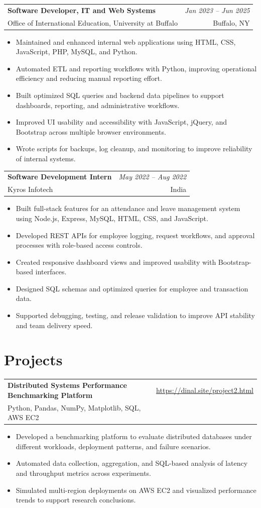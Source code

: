 \documentclass[letterpaper,10pt]{article}
\makeatletter
\newcommand{\resumeSubheading}[4]{
  \vspace{1pt}
  \begin{tabularx}{\textwidth}{@{}Xr@{}}
    \textbf{#1} & \textit{#2} \\
    \textcolor{textgray}{#3} & \textcolor{textgray}{#4} \\
  \end{tabularx}
}
\newcommand{\resumeProjectHeading}[3]{
  \vspace{1pt}
  \begin{tabularx}{\textwidth}{@{}Xr@{}}
    \textbf{#1} & \href{#3}{\textcolor{accent}{#3}} \\
    \textcolor{textgray}{#2} & \\
  \end{tabularx}
}
\makeatother
\begin{document}
\resumeSubheading
  {Software Developer, IT and Web Systems}{Jan 2023 -- Jun 2025}
  {Office of International Education, University at Buffalo}{Buffalo, NY}
\begin{itemize}
  \item Maintained and enhanced internal web applications using HTML, CSS, JavaScript, PHP, MySQL, and Python.
  \item Automated ETL and reporting workflows with Python, improving operational efficiency and reducing manual reporting effort.
  \item Built optimized SQL queries and backend data pipelines to support dashboards, reporting, and administrative workflows.
  \item Improved UI usability and accessibility with JavaScript, jQuery, and Bootstrap across multiple browser environments.
  \item Wrote scripts for backups, log cleanup, and monitoring to improve reliability of internal systems.
\end{itemize}

\resumeSubheading
  {Software Development Intern}{May 2022 -- Aug 2022}
  {Kyros Infotech}{India}
\begin{itemize}
  \item Built full-stack features for an attendance and leave management system using Node.js, Express, MySQL, HTML, CSS, and JavaScript.
  \item Developed REST APIs for employee logging, request workflows, and approval processes with role-based access controls.
  \item Created responsive dashboard views and improved usability with Bootstrap-based interfaces.
  \item Designed SQL schemas and optimized queries for employee and transaction data.
  \item Supported debugging, testing, and release validation to improve API stability and team delivery speed.
\end{itemize}

\section{Projects}
\resumeProjectHeading
  {Distributed Systems Performance Benchmarking Platform}
  {Python, Pandas, NumPy, Matplotlib, SQL, AWS EC2}
  {https://dinal.site/project2.html}
\begin{itemize}
  \item Developed a benchmarking platform to evaluate distributed databases under different workloads, deployment patterns, and failure scenarios.
  \item Automated data collection, aggregation, and SQL-based analysis of latency and throughput metrics across experiments.
  \item Simulated multi-region deployments on AWS EC2 and visualized performance trends to support research conclusions.
\end{itemize}
\end{document}
